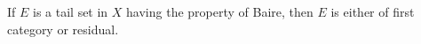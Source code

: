 If $E$ is a tail set in $X$ having the property of Baire, then $E$ is either of first category or residual.
